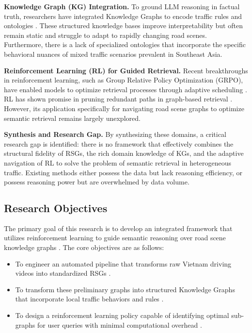 \documentclass[a4paper, 12pt]{article}
\begin{document}
	\textbf{Knowledge Graph (KG) Integration.} To ground LLM reasoning in factual truth, researchers have integrated Knowledge Graphs to encode traffic rules and ontologies \cite{morignot2014ontology, pan2024kgllm}. These structured knowledge bases improve interpretability but often remain static and struggle to adapt to rapidly changing road scenes. Furthermore, there is a lack of specialized ontologies that incorporate the specific behavioral nuances of mixed traffic scenarios prevalent in Southeast Asia.
	
	\textbf{Reinforcement Learning (RL) for Guided Retrieval.} Recent breakthroughs in reinforcement learning, such as Group Relative Policy Optimization (GRPO), have enabled models to optimize retrieval processes through adaptive scheduling \cite{song2025plan, tencent2025grpo}. RL has shown promise in pruning redundant paths in graph-based retrieval \cite{chen2025pathrag}. However, its application specifically for navigating road scene graphs to optimize semantic retrieval remains largely unexplored.
	
	\textbf{Synthesis and Research Gap.} By synthesizing these domains, a critical research gap is identified: there is no framework that effectively combines the structural fidelity of RSGs, the rich domain knowledge of KGs, and the adaptive navigation of RL to solve the problem of semantic retrieval in heterogeneous traffic. Existing methods either possess the data but lack reasoning efficiency, or possess reasoning power but are overwhelmed by data volume. %
	
	
	
	\subsection{Research Objectives}
	The primary goal of this research is to develop an integrated framework that utilizes reinforcement learning to guide semantic reasoning over road scene knowledge graphs \cite{song2025plan, hu2024rlrag}. The core objectives are as follows:
	\begin{itemize}
		\item To engineer an automated pipeline that transforms raw Vietnam driving videos into standardized RSGs \cite{roadscene2vec2024, tian2025query}.
		\item To transform these preliminary graphs into structured Knowledge Graphs that incorporate local traffic behaviors and rules \cite{morignot2014ontology}.
		\item To design a reinforcement learning policy capable of identifying optimal sub-graphs for user queries with minimal computational overhead \cite{tencent2025grpo}.
	\end{itemize}
	
\end{document}
